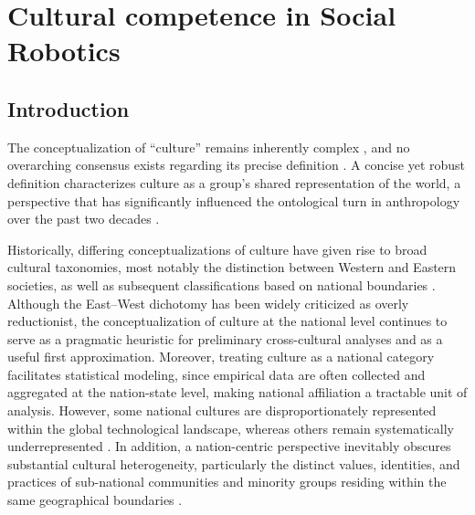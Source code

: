 
\chapter{Cultural competence in Social Robotics} 
\label{ch1}

\ifpdf
    \graphicspath{{Chapter1/Figs/Raster/}{Chapter1/Figs/PDF/}{Chapter1/Figs/}}
\else
    \graphicspath{{Chapter1/Figs/Vector/}{Chapter1/Figs/}}
\fi


\section{Introduction}
\label{ch1:sec:introduction}

The conceptualization of ``culture'' remains inherently complex \citep{Geertz73, Hofstede80, Leininger1988, Schwartz19921, Henare2007, Carrithers2010}, and no overarching consensus exists regarding its precise definition \citep{Hofstede2003}. 
A concise yet robust definition characterizes culture as a group's shared representation of the world, a perspective that has significantly influenced the ontological turn in anthropology over the past two decades \citep{Henare2007}. 

Historically, differing conceptualizations of culture have given rise to broad cultural taxonomies, most notably the distinction between Western and Eastern societies, as well as subsequent classifications based on national boundaries \citep{hofstede2001culture}. 
Although the East–West dichotomy has been widely criticized as overly reductionist, the conceptualization of culture at the national level continues to serve as a pragmatic heuristic \citep{fedriga2024representation} for preliminary cross-cultural analyses and as a useful first approximation. 
Moreover, treating culture as a national category facilitates statistical modeling, since empirical data are often collected and aggregated at the nation-state level, making national affiliation a tractable unit of analysis. 
However, some national cultures are disproportionately represented within the global technological landscape, whereas others remain systematically underrepresented \citep{not_uniform_data}. 
In addition, a nation-centric perspective inevitably obscures substantial cultural heterogeneity, particularly the distinct values, identities, and practices of sub-national communities and minority groups residing within the same geographical boundaries \citep{mcsweeney2002hofstede, venaik2013critical}.

